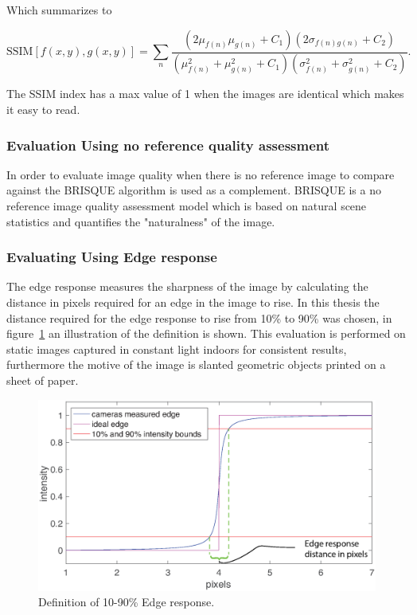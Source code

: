 Which summarizes to

\begin{equation}
\text{SSIM}[f(x,y),g(x,y)] = \sum_n \frac{(2\mu_{f(n)}\mu_{g(n)} + C_1)(2\sigma_{f(n)g(n)} + C_2)}{(\mu_{f(n)}^2 + \mu_{g(n)}^2 + C_1)(\sigma_{f(n)}^2 + \sigma_{g(n)}^2 + C_2)}.
\end{equation} 

The SSIM index has a max value of 1 when the images are identical which makes it easy to read. \cite{book:image_processing}

\subsubsection{Evaluation Using no reference quality assessment}
In order to evaluate image quality when there is no reference image to compare against the BRISQUE algorithm is used as a complement. BRISQUE is a no reference image quality assessment model which is based on natural scene statistics and quantifies the "naturalness" of the image.   \cite{article:brisque}

\subsubsection{Evaluating Using Edge response}
The edge response measures the sharpness of the image by calculating the distance in pixels required for an edge in the image to rise. In this thesis the distance required for the edge response to rise from 10\% to 90\% was chosen, in figure~\ref{fig:edge_response_def} an illustration of the definition is shown. This evaluation is performed on static images captured in constant light indoors for consistent results, furthermore the motive of the image is slanted geometric objects printed on a sheet of paper.\cite{article:FOI_pres_sens}
 
\begin{figure}[H]
\includegraphics[width = 1\textwidth]{./result/edge_response.eps}
	\caption{Definition of 10-90\% Edge response.}
	\label{fig:edge_response_def}
\end{figure}


